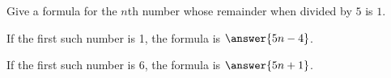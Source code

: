 \documentclass[nooutcomes]{ximera}
\begin{document}
\begin{problem}
Give a formula for the $n$th number whose remainder when divided
  by $5$ is $1$. 
  
  If the first such number is 1, the formula is $\answer{5n-4}$. 

  If the first such number is 6, the formula is $\answer{5n+1}$. 
\end{problem}
%
%
%
%
%
%
%
\end{document}
